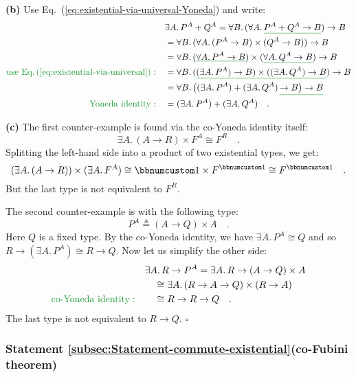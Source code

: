 \textbf{(b)} Use Eq.~(\ref{eq:existential-via-universal-Yoneda})
and write:
\begin{align*}
 & \exists A.\,P^{A}+Q^{A}=\forall B.\,(\forall A.\,\gunderline{P^{A}+Q^{A}\rightarrow B})\rightarrow B\\
 & =\forall B.\,(\forall A.\,(P^{A}\rightarrow B)\times(Q^{A}\rightarrow B))\rightarrow B\\
 & =\forall B.\,(\gunderline{\forall A.\,P^{A}\rightarrow B})\times(\gunderline{\forall A.\,Q^{A}\rightarrow B})\rightarrow B\\
{\color{greenunder}\text{use Eq.\,(\ref{eq:existential-via-universal})}:}\quad & =\forall B.\,(\gunderline{(\exists A.\,P^{A})\rightarrow B)\times((\exists A.\,Q^{A})\rightarrow B})\rightarrow B\\
 & =\forall B.\,\big((\exists A.\,P^{A})+(\exists A.\,Q^{A})\,\gunderline{\rightarrow B\big)\rightarrow B}\\
{\color{greenunder}\text{Yoneda identity}:}\quad & =(\exists A.\,P^{A})+(\exists A.\,Q^{A})\quad.
\end{align*}

\textbf{(c)} The first counter-example is found via the co-Yoneda
identity itself:
\[
\exists A.\,(A\rightarrow R)\times F^{A}\cong F^{R}\quad.
\]
Splitting the left-hand side into a product of two existential types,
we get:
\[
(\exists A.\,(A\rightarrow R))\times(\exists A.\,F^{A})\cong\bbnum 1\times F^{\bbnum 1}\cong F^{\bbnum 1}\quad.
\]
But the last type is not equivalent to $F^{R}$.

The second counter-example is with the following type:
\[
P^{A}\triangleq(A\rightarrow Q)\times A\quad.
\]
Here $Q$ is a fixed type. By the co-Yoneda identity, we have $\exists A.\,P^{A}\cong Q$
and so $R\rightarrow(\exists A.\,P^{A})\cong R\rightarrow Q$. Now
let us simplify the other side: 
\begin{align*}
 & \exists A.\,R\rightarrow P^{A}=\exists A.\,R\rightarrow(A\rightarrow Q)\times A\\
 & \quad\cong\exists A.\,(R\rightarrow A\rightarrow Q)\times(R\rightarrow A)\\
{\color{greenunder}\text{co-Yoneda identity}:}\quad & \quad\cong R\rightarrow R\rightarrow Q\quad.
\end{align*}
The last type is not equivalent to $R\rightarrow Q$. $\square$

\subsubsection{Statement \label{subsec:Statement-commute-existential}\ref{subsec:Statement-commute-existential}(co-Fubini
theorem)}

